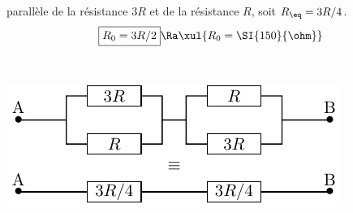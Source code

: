 \documentclass[a4paper, 10pt, garamond, oneside]{book}
\begin{document}
{\begin{enumerate}
\begin{minipage}[t]{0.55\linewidth}
			      parallèle de la résistance $3R$ et de la résistance $R$,
			      soit $R_{\eq}=3R/4$.
            \bigbreak
            \[
              \boxed{R_0 = 3R/2} \Ra \xul{R_0 = \SI{150}{\ohm}}
            \]
		      \end{minipage}
          \hfill
		      \begin{minipage}[t]{0.4\linewidth}
            ~
            \vspace{-20pt}
			      \begin{center}
				      \includegraphics[width=\linewidth]{diplin_q2}
			      \end{center}
		      \end{minipage}
	\end{enumerate}
}
\end{document}
